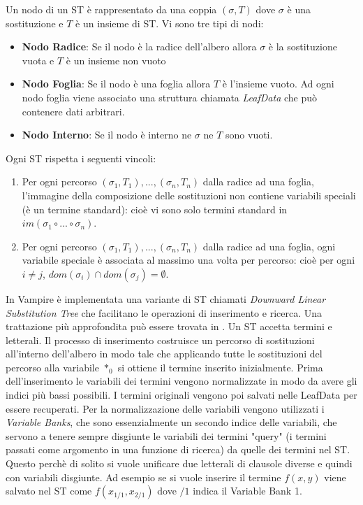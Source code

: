 \documentclass[./main.tex]{subfiles}
\begin{document}
Un nodo di un ST è rappresentato da una coppia $(\sigma, T)$ dove $\sigma$ è una sostituzione e $T$ è un insieme di ST.
Vi sono tre tipi di nodi:

\begin{itemize}
    \item \textbf{Nodo Radice}: Se il nodo è la radice dell'albero allora $\sigma$ è la sostituzione vuota e $T$ è un insieme non vuoto
    \item \textbf{Nodo Foglia}: Se il nodo è una foglia allora $T$ è l'insieme vuoto. Ad ogni nodo foglia 
    viene associato una struttura chiamata \textit{LeafData} che può contenere dati arbitrari.
    \item \textbf{Nodo Interno}: Se il nodo è interno ne $\sigma$ ne $T$ sono vuoti.
\end{itemize}


Ogni ST rispetta i seguenti vincoli:

\begin{enumerate}
    \item Per ogni percorso $(\sigma_1, T_1), ... , (\sigma_n, T_n)$
     dalla radice ad una foglia, l'immagine della composizione delle sostituzioni non contiene variabili speciali (è un termine standard):
     cioè vi sono solo termini standard in $im(\sigma_1 \circ ... \circ \sigma_n)$.
    \item Per ogni percorso $(\sigma_1, T_1), ... , (\sigma_n, T_n)$
    dalla radice ad una foglia, ogni variabile speciale è associata al massimo una volta per percorso:
    cioè per ogni $i \neq j$, $dom(\sigma_i) \cap dom(\sigma_j) = \emptyset$.
\end{enumerate}

In Vampire è implementata una variante di ST chiamati \textit{Downward Linear Substitution Tree} che facilitano
le operazioni di inserimento e ricerca. Una trattazione più approfondita può essere trovata in \cite{vampireUnification}.
Un ST accetta termini e letterali. Il processo di inserimento costruisce un percorso di sostituzioni all'interno dell'albero
in modo tale che applicando tutte le sostituzioni del percorso alla variabile $*_0$ si ottiene il termine inserito inizialmente.
Prima dell'inserimento le variabili dei termini vengono normalizzate
in modo da avere gli indici più bassi possibili. I termini originali vengono poi salvati nelle LeafData per essere recuperati.
Per la normalizzazione delle variabili vengono utilizzati i \textit{Variable Banks}, che sono essenzialmente un secondo indice delle variabili,
 che servono a tenere sempre disgiunte le variabili dei termini "query" (i termini passati come argomento in una funzione di ricerca)
da quelle dei termini nel ST. 
Questo perchè di solito si vuole unificare due letterali di clausole diverse e quindi con variabili disgiunte.
Ad esempio se si vuole inserire il termine $f(x, y)$ viene salvato nel ST come
$f(x_{1/1}, x_{2/1})$ dove $/1$ indica il Variable Bank 1.
\end{document}
